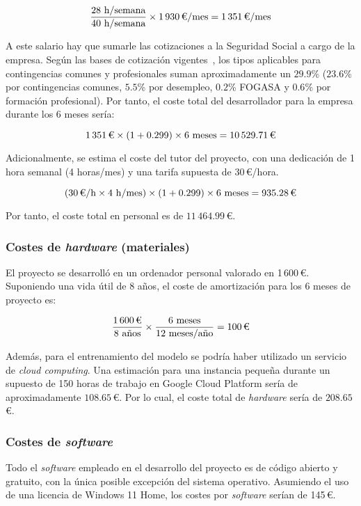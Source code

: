 \[\frac{28 \text{ h/semana}}{40 \text{ h/semana}} \times 1\,930 \text{\,€/mes} = 1\,351 \text{\,€/mes}\]

A este salario hay que sumarle las cotizaciones a la Seguridad Social a cargo de la empresa. Según las bases de cotización vigentes~\cite{segSocial2025}, los tipos aplicables para contingencias comunes y profesionales suman aproximadamente un $29.9$\% ($23.6$\% por contingencias comunes, $5.5$\% por desempleo, $0.2$\% FOGASA y $0.6$\% por formación profesional). Por tanto, el coste total del desarrollador para la empresa durante los 6 meses sería:

\[1\,351 \text{\,€} \times (1 + 0.299) \times 6 \text{ meses} = 10\,529.71 \text{\,€}\]

Adicionalmente, se estima el coste del tutor del proyecto, con una dedicación de 1 hora semanal (4 horas/mes) y una tarifa supuesta de 30\,€/hora.

\[(30 \text{\,€/h} \times 4 \text{ h/mes}) \times (1 + 0.299) \times 6 \text{ meses} = 935.28 \text{\,€}\]

Por tanto, el coste total en personal es de $11\,464.99$\,€.

\subsubsection{Costes de \textit{hardware} (materiales)}

El proyecto se desarrolló en un ordenador personal valorado en 1\,600\,€. Suponiendo una vida útil de 8 años, el coste de amortización para los 6 meses de proyecto es:

\[\frac{1\,600 \text{\,€}}{8 \text{ años}} \times \frac{6 \text{ meses}}{12 \text{ meses/año}} = 100 \text{\,€}\]

Además, para el entrenamiento del modelo se podría haber utilizado un servicio de \textit{cloud computing}. Una estimación para una instancia pequeña durante un supuesto de 150 horas de trabajo en Google Cloud Platform sería de aproximadamente $108.65$\,€. Por lo cual, el coste total de \textit{hardware} sería de $208.65$\,€.

\subsubsection{Costes de \textit{software}}

Todo el \textit{software} empleado en el desarrollo del proyecto es de código abierto y gratuito, con la única posible excepción del sistema operativo. Asumiendo el uso de una licencia de Windows 11 Home, los costes por \textit{software} serían de 145\,€.

